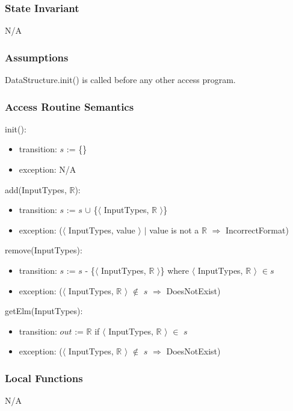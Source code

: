 \documentclass[12pt, titlepage]{article}
\begin{document}
\subsubsection{State Invariant}
N/A

\subsubsection{Assumptions}

DataStructure.init() is called before any other access program.

\subsubsection{Access Routine Semantics}

\noindent init():
\begin{itemize}
	\item transition: $s$ := \{\}
	\item exception: N/A
\end{itemize}

\noindent add(InputTypes, $\mathbb{R}$):
\begin{itemize}
	\item transition: $s$ := $s$ $\cup$ \{$\langle$ InputTypes, $\mathbb{R}$ $\rangle$\}
	\item exception: ($\langle$ InputTypes, value $\rangle$ $|$ value is not a $\mathbb{R}$ $\Rightarrow$ IncorrectFormat) 
\end{itemize}

\noindent remove(InputTypes):
\begin{itemize}
	\item transition: $s$ := $s$ - \{$\langle$ InputTypes, $\mathbb{R}$ $\rangle$\} where $\langle$ InputTypes, $\mathbb{R}$ $\rangle$ $\in $$s$
	\item exception: ($\langle$ InputTypes, $\mathbb{R}$ $\rangle$ $\notin$ $s$ $\Rightarrow$ DoesNotExist)
\end{itemize}

\noindent getElm(InputTypes):
\begin{itemize}
	\item transition: $out$ := $\mathbb{R}$ if $\langle$ InputTypes, $\mathbb{R}$ $\rangle$ $\in$ $s$
	\item exception: ($\langle$ InputTypes, $\mathbb{R}$ $\rangle$ $\notin$ $s$ $\Rightarrow$ DoesNotExist)
\end{itemize}

\subsubsection{Local Functions}
N/A
\end{document}
